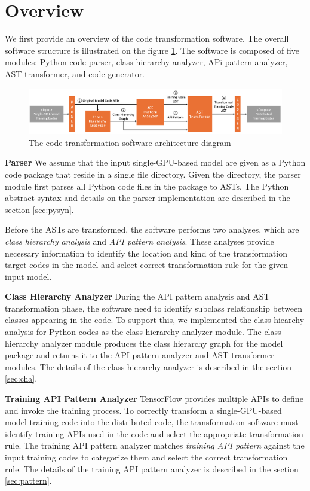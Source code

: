 \section{Overview}

We first provide an overview of the code transformation software.
The overall software structure is illustrated on the figure \ref{sysarch}.
The software is composed of five modules: Python code parser,
class hierarchy analyzer, APi pattern analyzer, AST transformer,
and code generator.

\begin{figure}[h]
  \includegraphics[width=1\textwidth]{system_arch}
  \caption{The code transformation software architecture diagram}
  \label{sysarch}
\end{figure}

\textbf{Parser}
We assume that the input single-GPU-based model are given as a Python code
package that reside in a single file directory.
Given the directory, the parser module first parses all Python code files
in the package to ASTs.
The Python abstract syntax and details on the parser implementation
are described in the section \ref{sec:pysyn}.

Before the ASTs are transformed, the software performs two analyses, 
which are \textit{class hierarchy analysis} and 
\textit{API pattern analysis}.
These analyses provide necessary information to identify the
location and kind of the transformation target codes in the model
and select correct transformation rule for the given input model.

\textbf{Class Hierarchy Analyzer}
During the API pattern analysis and AST transformation phase,
the software need to identify subclass relationship between
classes appearing in the code.
To support this, we implemented the class hiearchy analysis
for Python codes as the class hierarchy analyzer module.
The class hierarchy analyzer module produces the class hierarchy graph
for the model package and returns it to the API pattern analyzer and 
AST transformer modules. The details of the class hierarchy analyzer is
described in the section \ref{sec:cha}.

\textbf{Training API Pattern Analyzer}
TensorFlow provides multiple APIs to define and invoke the training process.
To correctly transform a single-GPU-based model training code into
the distributed code, the transformation software must identify
training APIs used in the code and select the appropriate transformation rule.
The training API pattern analyzer matches \textit{training API pattern}
against the input training codes to categorize them and select
the correct transformation rule. The details of the training API pattern
analyzer is described in the section \ref{sec:pattern}.

